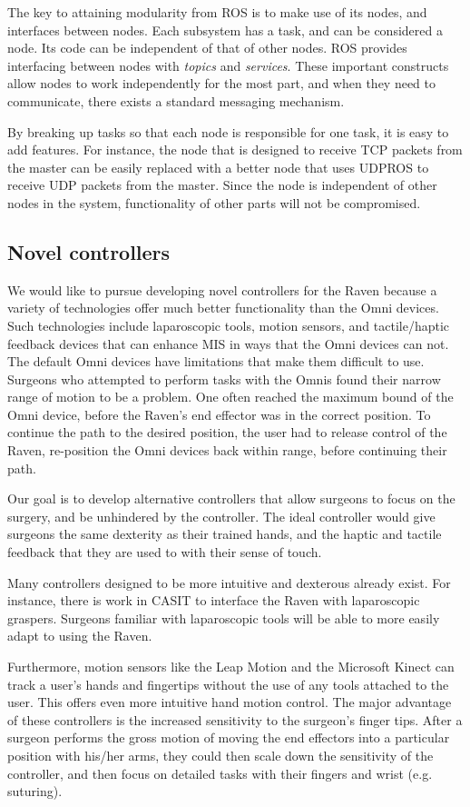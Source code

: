 \documentclass[letterpaper,twocolumn,10pt]{article}
\begin{document}
The key to attaining modularity from ROS is to make use of its nodes, 
and interfaces between nodes. Each subsystem has a task, and can be 
considered a node. Its code can be independent of that of other nodes. 
ROS provides interfacing between nodes with \emph{topics} and 
\emph{services}. These important constructs allow nodes to work 
independently for the most part, and when they need to communicate, 
there exists a standard messaging mechanism.

By breaking up tasks so that each node is responsible for one task, 
it is easy to add features. For instance, the node that is designed 
to receive TCP packets from the master can be easily replaced with 
a better node that uses UDPROS to receive UDP packets from the master. 
Since the node is independent of other nodes in the system, 
functionality of other parts will not be compromised.


\subsection{Novel controllers}
We would like to pursue developing novel controllers for the Raven
because a variety of technologies offer much better functionality than
the Omni devices. Such technologies include laparoscopic tools, motion
sensors, and tactile/haptic feedback devices that can enhance MIS in
ways that the Omni devices can not.  The default Omni devices have
limitations that make them difficult to use. Surgeons who attempted to
perform tasks with the Omnis found their narrow range of motion to be
a problem. One often reached the maximum bound of the Omni device,
before the Raven's end effector was in the correct position. To
continue the path to the desired position, the user had to release
control of the Raven, re-position the Omni devices back within range,
before continuing their path.

Our goal is to develop alternative controllers that allow surgeons to
focus on the surgery, and be unhindered by the controller. The ideal
controller would give surgeons the same dexterity as their trained
hands, and the haptic and tactile feedback that they are used to with
their sense of touch.

Many controllers designed to be more intuitive and dexterous already
exist. For instance, there is work in CASIT to interface the Raven
with laparoscopic graspers. Surgeons familiar with laparoscopic tools
will be able to more easily adapt to using the Raven.

Furthermore, motion sensors like the Leap Motion and the Microsoft
Kinect can track a user's hands and fingertips without the use of any
tools attached to the user. This offers even more intuitive hand
motion control. The major advantage of these controllers is the
increased sensitivity to the surgeon's finger tips. After a surgeon
performs the gross motion of moving the end effectors into a
particular position with his/her arms, they could then scale down the
sensitivity of the controller, and then focus on detailed tasks with
their fingers and wrist (e.g. suturing).
\end{document}
